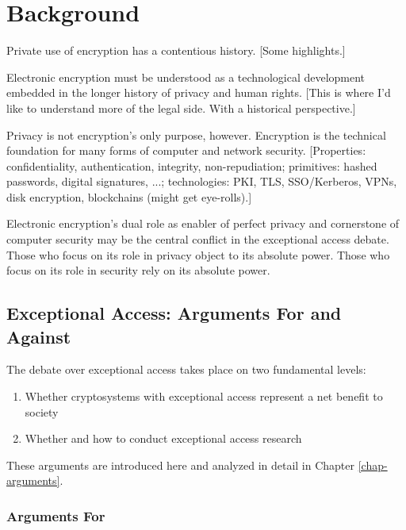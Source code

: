 \chapter{Background}
\label{chap-background}

Private use of encryption has a contentious history. [Some highlights.]

Electronic encryption must be understood as a technological development embedded in the longer history of privacy and
human rights. [This is where I'd like to understand more of the legal side. With a historical perspective.]

Privacy is not encryption's only purpose, however. Encryption is the technical foundation for many forms of computer and
network security. [Properties: confidentiality, authentication, integrity, non-repudiation; primitives: hashed
passwords, digital signatures, ...; technologies: PKI, TLS, SSO/Kerberos, VPNs, disk encryption, blockchains (might get
eye-rolls).]

Electronic encryption's dual role as enabler of perfect privacy and cornerstone of computer security may be the central
conflict in the exceptional access debate. Those who focus on its role in privacy object to its absolute power. Those
who focus on its role in security rely on its absolute power.


\section{Exceptional Access: Arguments For and Against}
\label{sec-argsbackground}

The debate over exceptional access takes place on two fundamental levels:
\begin{enumerate}
    \item Whether cryptosystems with exceptional access represent a net benefit to society
    \item Whether and how to conduct exceptional access research
\end{enumerate}

These arguments are introduced here and analyzed in detail in Chapter \ref{chap-arguments}.

\subsection{Arguments For}

